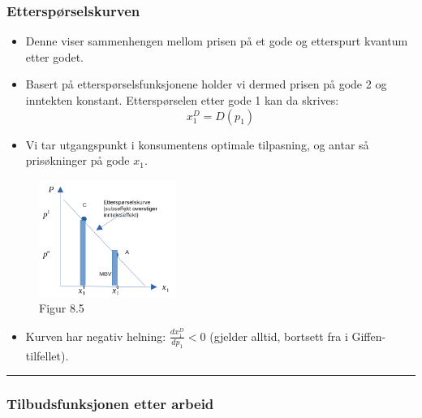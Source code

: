 \documentclass[
  letterpaper,
  DIV=11,
  numbers=noendperiod]{scrartcl}
\providecommand{\tightlist}{%
  \setlength{\itemsep}{0pt}\setlength{\parskip}{0pt}}\usepackage{longtable,booktabs,array}
\begin{document}
\subsubsection{Etterspørselskurven}\label{etterspuxf8rselskurven}

\begin{itemize}
\tightlist
\item
  Denne viser sammenhengen mellom prisen på et gode og etterspurt
  kvantum etter godet.
\item
  Basert på etterspørselsfunksjonene holder vi dermed prisen på gode 2
  og inntekten konstant. Etterspørselen etter gode 1 kan da skrives:
  \begin{equation*}
  x_{1}^{D}=D(p_1)
  \end{equation*}
\item
  Vi tar utgangspunkt i konsumentens optimale tilpasning, og antar så
  prisøkninger på gode \(x_1\).
\end{itemize}

\begin{figure}[H]

{\centering \includegraphics[width=0.4\textwidth,height=\textheight]{drawio/ekonsum.png}

}

\caption{Figur 8.5}

\end{figure}%

\begin{itemize}
\tightlist
\item
  Kurven har negativ helning: \(\frac{dx_1^D}{dp_1}<0\) (gjelder alltid,
  bortsett fra i Giffen-tilfellet).
\end{itemize}

\begin{center}\rule{0.5\linewidth}{0.5pt}\end{center}

\subsubsection{Tilbudsfunksjonen etter
arbeid}\label{tilbudsfunksjonen-etter-arbeid}
\end{document}
